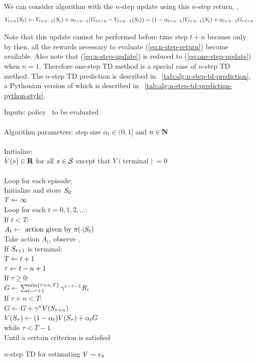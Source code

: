 We can consider algorithm with the $n$-step update using this $n$-step return, \ie,
\begin{equation}
\label{eq:n-step-update}
V_{t+n}(S_{t}) \leftarrow V_{t+n-1}(S_{t}) + \alpha_{t+n-1} (G_{{t}:{t+n}} - V_{t+n-1}(S_{t}))
= (1-\alpha_{t+n-1}) V_{t+n-1}(S_{t}) + \alpha_{t+n-1} G_{{t}:{t+n}}
\end{equation}

Note that this update cannot be performed before time step $t+n$ because only by then, all the rewards necessary to evaluate (\ref{eq:n-step-return})
become available. Also note that (\ref{eq:n-step-update}) is reduced to (\ref{eq:one-step-update}) when $n=1$.
Therefore one-step TD method is a special case of $n$-step TD method.
The $n$-step TD prediction is described in \tablename~\ref{tab:alg:n-step-td-prediction},
a Pythonian version of which is described in \tablename~\ref{tab:alg:n-step-td-prediction-python-style}.



\begin{table}
\beginalg
Inputs: policy \pol\ to be evaluated\\
\\
Algorithm parameters: step size $\alpha_t \in (0, 1]$ and $n\in{\mbox{\bf N}}$\\
\\
Initialize:\\
\> $V(s)\in\mathbf{R}$ for all $s\in\mathcal{S}$ except that $V(\mathrm{terminal})=0$\\
\\
Loop for each episode:\\
\> Initialize and store $S_{0}$\\
\> $T \leftarrow \infty$\\
\> Loop for each $t=0,1,2,\ldots$:\\
\> \> If $t<T$:\\
\> \> \> $A_t \leftarrow \mbox{ action given by } \pi(\cdot|S_{t})$\\
\> \> \> Take action $A_t$, observe , \\
\> \> \> If $S_{t+1}$ is terminal:\\
\> \> \> \> $T \leftarrow t+1$\\
\> \> $\tau \leftarrow t-n+1$\\
\> \> If $\tau \geq 0$:\\
\> \> \> $G \leftarrow \sum_{i=\tau+1}^{\min\{\tau+n,T\}} \gamma^{i-\tau-1} R_{i}$\\
\> \> \> If $\tau+n < T$:\\
\> \> \> \> $G \leftarrow G + \gamma^{n} V(S_{\tau+n})$\\
\> \> \> $V(S_{\tau}) \leftarrow (1-\alpha_{t}) V(S_{\tau}) + \alpha_{t} G$\\
\> while $\tau<T-1$\\
Until a certain criterion is satisfied
\endalg
\caption{$n$-step TD for estimating $V\sim v_{\pi}$}
\label{tab:alg:n-step-td-prediction}
\end{table}



